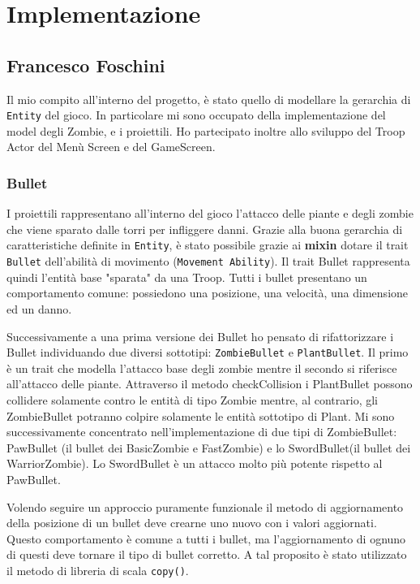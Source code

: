 \newpage
\section{Implementazione}


\subsection{Francesco Foschini}
Il mio compito all'interno del progetto, è stato quello di modellare la gerarchia di \texttt{Entity} del gioco.
In particolare mi sono occupato della implementazione del model degli Zombie, e i proiettili.
Ho partecipato inoltre allo sviluppo del Troop Actor del Menù Screen e del GameScreen.

\subsubsection{Bullet}
I proiettili rappresentano all'interno del gioco l'attacco delle piante e degli zombie che viene sparato dalle torri
per infliggere danni. Grazie alla buona gerarchia di caratteristiche definite in \texttt{Entity}, è stato possibile grazie  ai \textbf{mixin}
dotare il trait \texttt{Bullet} dell'abilità di movimento (\texttt{Movement Ability}).
Il trait Bullet rappresenta quindi l'entità base "sparata" da una Troop.
Tutti i bullet presentano un comportamento comune: possiedono una posizione, una velocità, una dimensione ed un danno.


Successivamente a una prima versione dei Bullet ho pensato di rifattorizzare i Bullet individuando due diversi sottotipi: \texttt{ZombieBullet} e \texttt{PlantBullet}.
Il primo è un trait che modella l'attacco base degli zombie mentre il secondo si riferisce all'attacco delle piante.
Attraverso il metodo checkCollision i PlantBullet possono collidere solamente contro le entità di tipo Zombie mentre,
al contrario, gli ZombieBullet potranno colpire solamente le entità sottotipo di Plant.
Mi sono successivamente concentrato nell'implementazione di due tipi di ZombieBullet: PawBullet (il bullet dei
BasicZombie e FastZombie) e lo SwordBullet(il bullet dei WarriorZombie).
Lo SwordBullet è un attacco molto più potente rispetto al PawBullet.

Volendo seguire un approccio puramente funzionale il metodo di aggiornamento della posizione di un bullet deve crearne uno nuovo
con i valori aggiornati. Questo comportamento è comune a tutti i bullet, ma l'aggiornamento
di ognuno di questi deve tornare il tipo di bullet corretto. A tal proposito è stato utilizzato il metodo
di libreria di scala  \texttt{copy()}.

